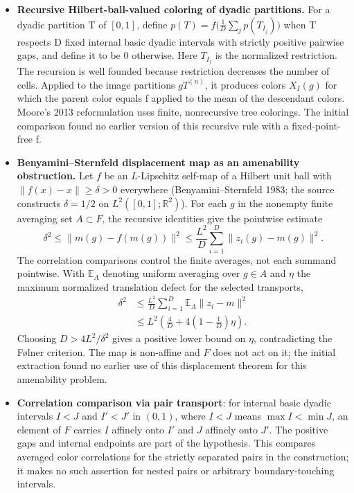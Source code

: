 \documentclass[11pt]{article}
\begin{document}
\begin{itemize}
\item \textbf{Recursive Hilbert-ball-valued coloring of dyadic partitions.} For a dyadic partition T of $[0,1]$, define $p(T)=f\big(\tfrac1D\sum_jp(T_{I_j})\big)$ when T respects D fixed internal basic dyadic intervals with strictly positive pairwise gaps, and define it to be 0 otherwise. Here $T_{I_j}$ is the normalized restriction. The recursion is well founded because restriction decreases the number of cells. Applied to the image partitions $gT^{(n)}$, it produces colors $X_I(g)$ for which the parent color equals f applied to the mean of the descendant colors. Moore\textquoteright{}s 2013 reformulation uses finite, nonrecursive tree colorings. The initial comparison found no earlier version of this recursive rule with a fixed-point-free f.
\item \textbf{Benyamini--Sternfeld displacement map as an amenability obstruction.} Let $f$ be an $L$-Lipschitz self-map of a Hilbert unit ball with $\|f(x)-x\|\ge\delta>0$ everywhere (Benyamini--Sternfeld 1983; the source constructs $\delta=1/2$ on $L^2([0,1];\mathbb R^2)$). For each $g$ in the nonempty finite averaging set $A\subset F$, the recursive identities give the pointwise estimate
\[
 \delta^2\le\|m(g)-f(m(g))\|^2
 \le\frac{L^2}{D}\sum_{i=1}^D\|z_i(g)-m(g)\|^2.
\]
The correlation comparisons control the finite averages, not each summand pointwise. With $\mathbb E_A$ denoting uniform averaging over $g\in A$ and $\eta$ the maximum normalized translation defect for the selected transports,
\[
\begin{aligned}
 \delta^2&\le\frac{L^2}{D}\sum_{i=1}^D\mathbb E_A\|z_i-m\|^2\\
 &\le L^2\left(\frac4D+4\left(1-\frac1D\right)\eta\right).
\end{aligned}
\]
Choosing $D>4L^2/\delta^2$ gives a positive lower bound on $\eta$, contradicting the Følner criterion. The map is non-affine and $F$ does not act on it; the initial extraction found no earlier use of this displacement theorem for this amenability problem.
\item \textbf{Correlation comparison via pair transport}: for internal basic dyadic intervals $I<J$ and $I'<J'$ in $(0,1)$, where $I<J$ means $\max I<\min J$, an element of $F$ carries $I$ affinely onto $I'$ and $J$ affinely onto $J'$. The positive gaps and internal endpoints are part of the hypothesis. This compares averaged color correlations for the strictly separated pairs in the construction; it makes no such assertion for nested pairs or arbitrary boundary-touching intervals.
\end{itemize}
\end{document}
